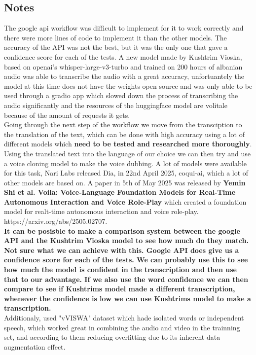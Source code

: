 \documentclass[12pt]{article}
\begin{document}
\subsection{Notes}
The google api workflow was difficult to implement for it to work correctly and there were more lines of code to implement it than the other models. The accuracy of the API was not the best, but it was the only one that gave a confidence score for each of the tests. A new model made by Kushtrim Vioska, based on openai's whisper-large-v3-turbo and trained on 200 hours of albanian audio was able to transcribe the audio with a great accuracy, unfortuantely the model at this time does not have the weights open source and was only able to be used through a gradio app which slowed down the process of transcribing the audio significantly and the resources of the huggingface model are volitale because of the amount of requests it gets.\\
Going through the next step of the workflow we move from the transciption to the translation of the text, which can be done with high accuracy using a lot of different models which \textbf{need to be tested and researched more thoroughly}. \\
Using the translated text into the language of our choice we can then try and use a voice cloning model to make the voice dubbing. A lot of models were available for this task, Nari Labs released Dia, in 22nd April 2025, coqui-ai, which a lot of other models are based on. 
A paper in 5th of May 2025 was released by \textbf{Yemin Shi et al. Voila: Voice-Language Foundation Models for Real-Time Autonomous Interaction and Voice Role-Play} which created a foundation model for realt-time autonomous interaction and voice role-play. https://arxiv.org/abs/2505.02707. \\
\textbf{It can be posisble to make a comparison system between the google API and the Kushtrim Vioska model to see how much do they match. Not sure what we can achieve with this. Google API does give us a confidence score for each of the tests. We can probably use this to see how much the model is confident in the transcription and then use that to our advantage. If we also use the word confidence we can then compare to see if Kushtrims model made a different transcription, whenever the confidence is low we can use Kushtrims model to make a transcription.}\\
Additionaly, \cite{PAWAR2024100084} used "vVISWA" dataset which hade isolated words or independent speech, which worked great in combining the audio and video in the trainning set, and according to them reducing overfitting due to its inherent data augmentation effect.
\newpage
\end{document}
